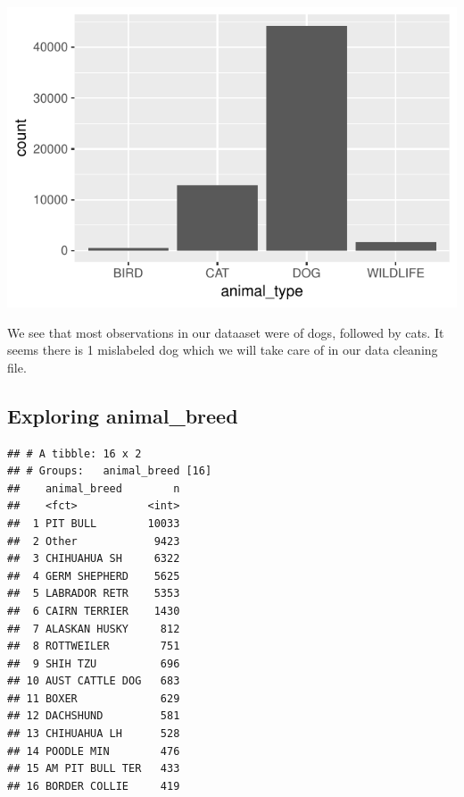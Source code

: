 \documentclass[]{article}
\newenvironment{Shaded}{\begin{snugshade}}{\end{snugshade}}
\newcommand{\KeywordTok}[1]{\textcolor[rgb]{0.13,0.29,0.53}{\textbf{#1}}}
\newcommand{\DataTypeTok}[1]{\textcolor[rgb]{0.13,0.29,0.53}{#1}}
\newcommand{\DecValTok}[1]{\textcolor[rgb]{0.00,0.00,0.81}{#1}}
\newcommand{\StringTok}[1]{\textcolor[rgb]{0.31,0.60,0.02}{#1}}
\newcommand{\OtherTok}[1]{\textcolor[rgb]{0.56,0.35,0.01}{#1}}
\newcommand{\OperatorTok}[1]{\textcolor[rgb]{0.81,0.36,0.00}{\textbf{#1}}}
\newcommand{\NormalTok}[1]{#1}
\begin{document}
\includegraphics{Stage_2_files/figure-latex/unnamed-chunk-2-1.pdf}

We see that most observations in our dataaset were of dogs, followed by
cats. It seems there is 1 mislabeled dog which we will take care of in
our data cleaning file.

\subsection{Exploring animal\_breed}\label{exploring-animal_breed}

\begin{Shaded}
\end{Shaded}

\begin{verbatim}
## # A tibble: 16 x 2
## # Groups:   animal_breed [16]
##    animal_breed        n
##    <fct>           <int>
##  1 PIT BULL        10033
##  2 Other            9423
##  3 CHIHUAHUA SH     6322
##  4 GERM SHEPHERD    5625
##  5 LABRADOR RETR    5353
##  6 CAIRN TERRIER    1430
##  7 ALASKAN HUSKY     812
##  8 ROTTWEILER        751
##  9 SHIH TZU          696
## 10 AUST CATTLE DOG   683
## 11 BOXER             629
## 12 DACHSHUND         581
## 13 CHIHUAHUA LH      528
## 14 POODLE MIN        476
## 15 AM PIT BULL TER   433
## 16 BORDER COLLIE     419
\end{verbatim}
\end{document}
